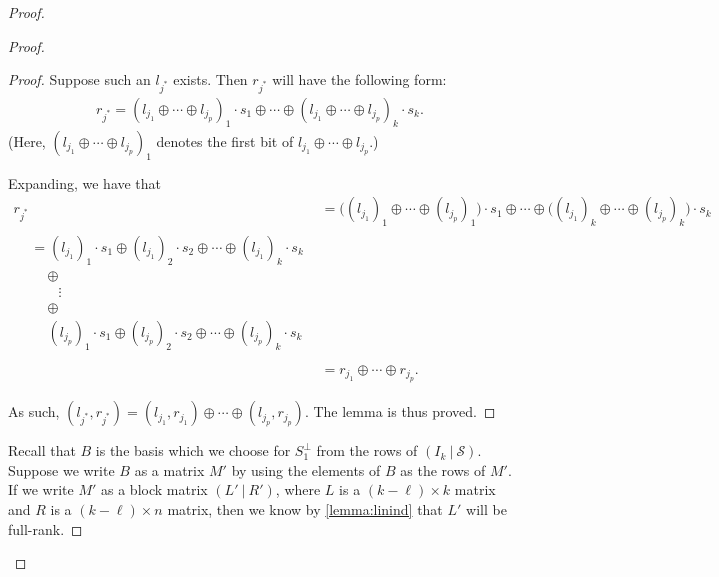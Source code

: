 \documentclass{article}
\begin{document}
\begin{proof}
\begin{itemize}
\begin{proof}
\begin{proof}
Suppose such an $l_{j^*}$ exists. Then $r_{j^*}$ will have the following form:
\begin{align}
r_{j^*} = (l_{j_1} \oplus \cdots \oplus l_{j_p})_1 \cdot s_1 \oplus \cdots \oplus (l_{j_1} \oplus \cdots \oplus l_{j_p})_k \cdot s_k.
\end{align}
(Here, $(l_{j_1} \oplus \cdots \oplus l_{j_p})_1$ denotes the first bit of $l_{j_1} \oplus \cdots \oplus l_{j_p}$.)

Expanding, we have that
\begin{align}
r_{j^*} &= \big( (l_{j_1})_1 \oplus \cdots \oplus (l_{j_p})_1 \big) \cdot s_1 \oplus \cdots \oplus \big( (l_{j_1})_k \oplus \cdots \oplus (l_{j_p})_k \big) \cdot s_k \\
\begin{split}
&= (l_{j_1})_1 \cdot s_1 \oplus (l_{j_1})_2 \cdot s_2 \oplus \cdots \oplus (l_{j_1})_k \cdot s_k \\
&\quad \: \oplus \\
&\quad \quad \vdots \\
&\quad \: \oplus \\
&\quad \: (l_{j_p})_1 \cdot s_1 \oplus (l_{j_p})_2 \cdot s_2 \oplus \cdots \oplus (l_{j_p})_k \cdot s_k \\
\end{split} \\
&= r_{j_1} \oplus \cdots \oplus r_{j_p}.
\end{align}

As such, $(l_{j^*}, r_{j^*}) = (l_{j_1}, r_{j_1}) \oplus \cdots \oplus (l_{j_p}, r_{j_p})$. The lemma is thus proved.
\end{proof}

Recall that $B$ is the basis which we choose for $S_1^\perp$ from the rows of $(I_k \:|\: \mathcal{S})$. Suppose we write $B$ as a matrix $M'$ by using the elements of $B$ as the rows of $M'$. If we write $M'$ as a block matrix $(L' \:|\: R')$, where $L$ is a $(k - \ell) \times k$ matrix and $R$ is a $(k - \ell) \times n$ matrix, then we know by \cref{lemma:linind} that $L'$ will be full-rank.


\end{proof}
\end{itemize}
\end{proof}
\end{document}
